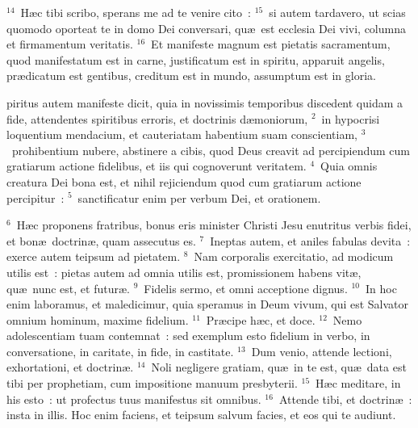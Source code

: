 ${}^{14}$~H\ae c tibi scribo, sperans me ad te venire cito~:
${}^{15}$~si autem tardavero, ut scias quomodo oporteat te in domo Dei conversari, qu\ae\ est ecclesia Dei vivi, columna et firmamentum veritatis.
${}^{16}$~Et manifeste magnum est pietatis sacramentum, quod manifestatum est in carne, justificatum est in spiritu, apparuit angelis, pr\ae dicatum est gentibus, creditum est in mundo, assumptum est in gloria.

\bchapter
{}piritus autem manifeste dicit, quia in novissimis temporibus discedent quidam a fide, attendentes spiritibus erroris, et doctrinis d\ae moniorum,
${}^{2}$~in hypocrisi loquentium mendacium, et cauteriatam habentium suam conscientiam,
${}^{3}$~prohibentium nubere, abstinere a cibis, quod Deus creavit ad percipiendum cum gratiarum actione fidelibus, et iis qui cognoverunt veritatem.
${}^{4}$~Quia omnis creatura Dei bona est, et nihil rejiciendum quod cum gratiarum actione percipitur~:
${}^{5}$~sanctificatur enim per verbum Dei, et orationem.


${}^{6}$~H\ae c proponens fratribus, bonus eris minister Christi Jesu enutritus verbis fidei, et bon\ae\ doctrin\ae , quam assecutus es.
${}^{7}$~Ineptas autem, et aniles fabulas devita~: exerce autem teipsum ad pietatem.
${}^{8}$~Nam corporalis exercitatio, ad modicum utilis est~: pietas autem ad omnia utilis est, promissionem habens vit\ae , qu\ae\ nunc est, et futur\ae .
${}^{9}$~Fidelis sermo, et omni acceptione dignus.
${}^{10}$~In hoc enim laboramus, et maledicimur, quia speramus in Deum vivum, qui est Salvator omnium hominum, maxime fidelium.
${}^{11}$~Pr\ae cipe h\ae c, et doce.
${}^{12}$~Nemo adolescentiam tuam contemnat~: sed exemplum esto fidelium in verbo, in conversatione, in caritate, in fide, in castitate.
${}^{13}$~Dum venio, attende lectioni, exhortationi, et doctrin\ae .
${}^{14}$~Noli negligere gratiam, qu\ae\ in te est, qu\ae\ data est tibi per prophetiam, cum impositione manuum presbyterii.
${}^{15}$~H\ae c meditare, in his esto~: ut profectus tuus manifestus sit omnibus.
${}^{16}$~Attende tibi, et doctrin\ae~: insta in illis. Hoc enim faciens, et teipsum salvum facies, et eos qui te audiunt.

